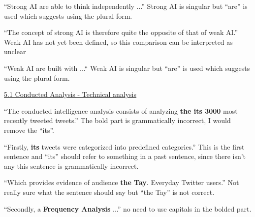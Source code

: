 “Strong AI are able to think independently ...” Strong AI is singular but “are” is used which suggests using the plural form.

“The concept of strong AI is therefore quite the opposite of that of weak AI.”  Weak AI has not yet been defined, so this comparison can be interpreted as unclear

“Weak AI are built with ...“ Weak AI is singular but “are” is used which suggests using the plural form.

\underline{5.1 Conducted Analysis - Technical analysis}

“The conducted intelligence analysis consists of analyzing \textbf{the its 3000} most recently tweeted tweets.” The bold part is grammatically incorrect, I would remove the “its”.

“Firstly, \textbf{its} tweets were categorized into predefined categories.” This is the first sentence and “its” should refer to something in a past sentence, since there isn’t any this sentence is grammatically incorrect.

“Which provides evidence of audience \textbf{the Tay}. Everyday Twitter users.” Not really sure what the sentence should say but “the Tay” is not correct.

“Secondly, a \textbf{Frequency Analysis} ...” no need to use capitals in the bolded part.